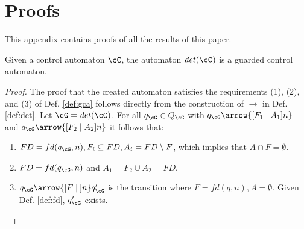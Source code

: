 \section{Proofs}\label{app:proofs}

This appendix contains proofs of all the results of this paper.

\begin{proposition}
Given a control automaton $\cC$, the automaton $\mathit{det}(\cC)$ is a guarded control automaton.
\end{proposition}

\begin{proof}
The proof that the created automaton satisfies the requirements (1), (2), and (3) of Def. \ref{def:gca} follows directly from the construction of $\rightarrow$ in Def. \ref{def:det}. Let $\cG = \mathit{det}(\cC)$. For all $q_\cG \in Q_\cG$ with $q_{\cG} \arrow{[F_1 \mid A_1] n}$ and $q_{\cG} \arrow{[F_2 \mid A_2] n}$ it follows that:
\begin{enumerate}
\item $FD = fd(q_{\cG},n), F_i \subseteq FD, A_i = FD \setminus F$, which implies that $A \cap F = \emptyset$.
\item $FD = fd(q_{\cG},n)$ and $A_1 = F_2 \cup A_2 = FD$.
%
\item $q_{\cG} \arrow{[F \mid \:] n} q_{\cG}'$ is the transition where $F = fd(q,n), A = \emptyset$. Given Def. \ref{def:fd}, $q_{\cG}'$ exists. 
%
\end{enumerate}
\end{proof}

